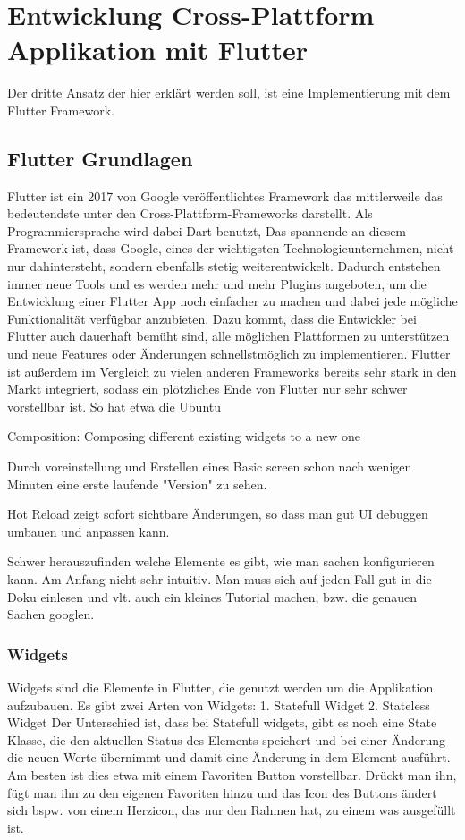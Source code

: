 \section{Entwicklung Cross-Plattform Applikation mit Flutter}
Der dritte Ansatz der hier erklärt werden soll, ist eine Implementierung mit dem Flutter Framework.

\subsection{Flutter Grundlagen}
Flutter ist ein 2017 von Google veröffentlichtes Framework das mittlerweile das bedeutendste unter den Cross-Plattform-Frameworks darstellt. Als Programmiersprache wird dabei Dart benutzt, Das spannende an diesem Framework ist, dass Google, eines der wichtigsten Technologieunternehmen, nicht nur dahintersteht, sondern  ebenfalls stetig weiterentwickelt. Dadurch entstehen immer neue Tools und es werden mehr und mehr Plugins angeboten, um die Entwicklung einer Flutter App noch einfacher zu machen und dabei jede mögliche Funktionalität verfügbar anzubieten. Dazu kommt, dass die Entwickler bei Flutter auch dauerhaft bemüht sind, alle möglichen Plattformen zu unterstützen und neue Features oder Änderungen schnellstmöglich zu implementieren.
Flutter ist außerdem im Vergleich zu vielen anderen Frameworks bereits sehr stark in den Markt integriert, sodass ein plötzliches Ende von Flutter nur sehr schwer vorstellbar ist. So hat etwa die Ubuntu

Composition: Composing different existing widgets to a new one

Durch voreinstellung und Erstellen eines Basic screen schon nach wenigen Minuten eine erste laufende "Version" zu sehen.

Hot Reload zeigt sofort sichtbare Änderungen, so dass man gut UI debuggen umbauen und anpassen kann.

Schwer herauszufinden welche Elemente es gibt, wie man sachen konfigurieren kann. Am Anfang nicht sehr intuitiv. Man muss sich auf jeden Fall gut in die Doku einlesen und vlt. auch ein kleines Tutorial machen, bzw. die genauen Sachen googlen.




\subsubsection{Widgets}
Widgets sind die Elemente in Flutter, die genutzt werden um die Applikation aufzubauen.
Es gibt zwei Arten von Widgets:
1. Statefull Widget
2. Stateless Widget
Der Unterschied ist, dass bei Statefull widgets, gibt es noch eine State Klasse, die den aktuellen Status des Elements speichert und bei einer Änderung die neuen Werte übernimmt und damit eine Änderung in dem Element ausführt. Am besten ist dies etwa mit einem Favoriten Button vorstellbar. Drückt man ihn, fügt man ihn zu den eigenen Favoriten hinzu und das Icon des Buttons ändert sich bspw. von einem Herzicon, das nur den Rahmen hat, zu einem was ausgefüllt ist.

